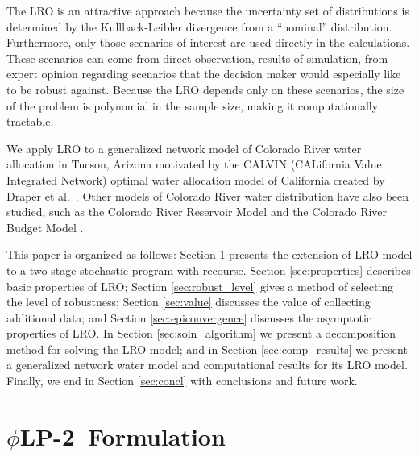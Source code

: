 \documentclass[11pt]{article}
\newcommand{\plp}{$\phi$LP-2}
\begin{document}
The LRO is an attractive approach because the uncertainty set of distributions is determined by the Kullback-Leibler divergence from a ``nominal'' distribution.
Furthermore, only those scenarios of interest are used directly in the calculations.
These scenarios can come from direct observation, results of simulation, from expert opinion regarding scenarios that the decision maker would especially like to be robust against.
Because the LRO depends only on these scenarios, the size of the problem is polynomial in the sample size, making it computationally tractable.

We apply LRO to a generalized network model of Colorado River water allocation in Tucson, Arizona motivated by the CALVIN (CALifornia Value Integrated Network) optimal water allocation model of California created by Draper et al.\ \cite{draper_etal_03}.
Other models of Colorado River water distribution have also been studied, such as the Colorado River Reservoir Model \cite{christensen2004effects} and the Colorado River Budget Model \cite{barnett2009sustainable}.

This paper is organized as follows: Section \ref{sec:lrlp2} presents the extension of LRO model to a two-stage stochastic program with recourse.
Section \ref{sec:properties} describes basic properties of LRO;
Section \ref{sec:robust_level} gives a method of selecting the level of robustness;
Section \ref{sec:value} discusses the value of collecting additional data;
and Section \ref{sec:epiconvergence} discusses the asymptotic properties of LRO.
In Section \ref{sec:soln_algorithm} we present a decomposition method for solving the LRO model; and in Section \ref{sec:comp_results} we present a generalized network water model and computational results for its LRO model.
Finally, we end in Section \ref{sec:concl} with conclusions and future work.


\section{\plp\ Formulation}
\label{sec:lrlp2}
\end{document}
